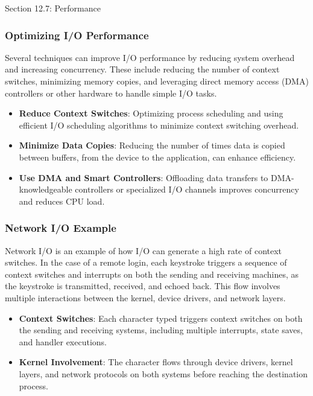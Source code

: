 \begin{notes}{Section 12.7: Performance}
    \subsubsection*{Optimizing I/O Performance}
    
    Several techniques can improve I/O performance by reducing system overhead and increasing concurrency. These include reducing the number of context switches, minimizing memory copies, and leveraging 
    direct memory access (DMA) controllers or other hardware to handle simple I/O tasks.
    
    \begin{highlight}
    
        \begin{itemize}
            \item \textbf{Reduce Context Switches}: Optimizing process scheduling and using efficient I/O scheduling algorithms to minimize context switching overhead.
            \item \textbf{Minimize Data Copies}: Reducing the number of times data is copied between buffers, from the device to the application, can enhance efficiency.
            \item \textbf{Use DMA and Smart Controllers}: Offloading data transfers to DMA-knowledgeable controllers or specialized I/O channels improves concurrency and reduces CPU load.
        \end{itemize}
    
    \end{highlight}
    
    \subsubsection*{Network I/O Example}
    
    Network I/O is an example of how I/O can generate a high rate of context switches. In the case of a remote login, each keystroke triggers a sequence of context switches and interrupts on both the sending 
    and receiving machines, as the keystroke is transmitted, received, and echoed back. This flow involves multiple interactions between the kernel, device drivers, and network layers.
    
    \begin{highlight}
    
        \begin{itemize}
            \item \textbf{Context Switches}: Each character typed triggers context switches on both the sending and receiving systems, including multiple interrupts, state saves, and handler executions.
            \item \textbf{Kernel Involvement}: The character flows through device drivers, kernel layers, and network protocols on both systems before reaching the destination process.
        \end{itemize}
    

\end{highlight}
\end{notes}
